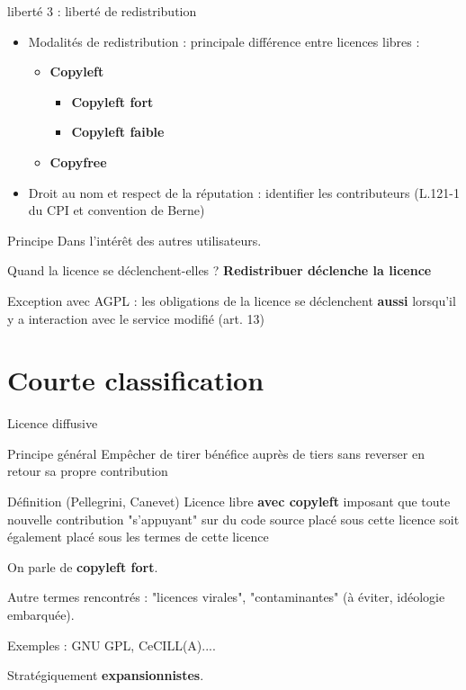 \documentclass{beamer}
\begin{document}
\begin{frame}{liberté 3 : liberté de redistribution}
  \begin{itemize}
  \item Modalités de redistribution : principale différence entre
    licences libres :
    \begin{itemize}
    \item \textbf{Copyleft}
      \begin{itemize}
      \item \textbf{Copyleft fort}
      \item \textbf{Copyleft faible}
      \end{itemize}
    \item \textbf{Copyfree}
    \end{itemize}

  \item Droit au nom et respect de la réputation : identifier les
    contributeurs (L.121-1 du CPI et convention de Berne)
  \end{itemize}
  \begin{alertblock}{Principe}
    Dans l'intérêt des autres utilisateurs.
  \end{alertblock}

\begin{alertblock}{Quand la licence se déclenchent-elles ?}
  \textbf{Redistribuer déclenche la licence}
\end{alertblock}
 
Exception avec AGPL : les obligations de la licence se déclenchent
\textbf{aussi} lorsqu'il y a interaction avec le service modifié
(art. 13)
\end{frame}




\section{Courte classification}


\begin{frame}{Licence diffusive}

  \begin{block}{Principe général}
    Empêcher de tirer bénéfice auprès de tiers sans reverser en retour
    sa propre contribution
  \end{block}

  \begin{alertblock}{Définition (Pellegrini, Canevet)}
    Licence libre \textbf{avec copyleft} imposant que toute nouvelle
    contribution "s'appuyant" sur du code source placé sous cette
    licence soit également placé sous les termes de cette licence
  \end{alertblock}

  On parle de \textbf{copyleft fort}.

  Autre termes rencontrés : "licences virales", "contaminantes" (à
  éviter, idéologie embarquée).
  
  Exemples : GNU GPL, CeCILL(A)....

  Stratégiquement \textbf{expansionnistes}.
\end{frame}
\end{document}
